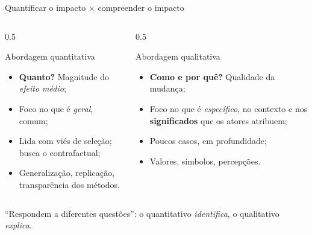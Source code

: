 
\begin{frame}{Quantificar o impacto $\times$ compreender o impacto}
  \begin{columns}[T]
    \begin{column}{0.5\textwidth}
      \begin{block}{Abordagem quantitativa}
        \small
        \begin{itemize}
          \item \textbf{Quanto?} Magnitude do \emph{efeito médio};
          \item Foco no que é \emph{geral}, comum;
          \item Lida com viés de seleção; busca o contrafactual;
          \item Generalização, replicação, transparência dos métodos.
        \end{itemize}
      \end{block}
    \end{column}
    \begin{column}{0.5\textwidth}
      \begin{atividadebox}{Abordagem qualitativa}
        \small
        \begin{itemize}
          \item \textbf{Como e por quê?} Qualidade da mudança;
          \item Foco no que é \emph{específico}, no contexto e nos \textbf{significados} que os atores atribuem;
          \item Poucos casos, em profundidade;
          \item Valores, símbolos, percepções.
        \end{itemize}
      \end{atividadebox}
    \end{column}
  \end{columns}
  \vspace{0.2cm}
  \begin{center}\small ``Respondem a diferentes questões'': o quantitativo \emph{identifica}, o qualitativo \emph{explica}.\end{center}
\end{frame}

